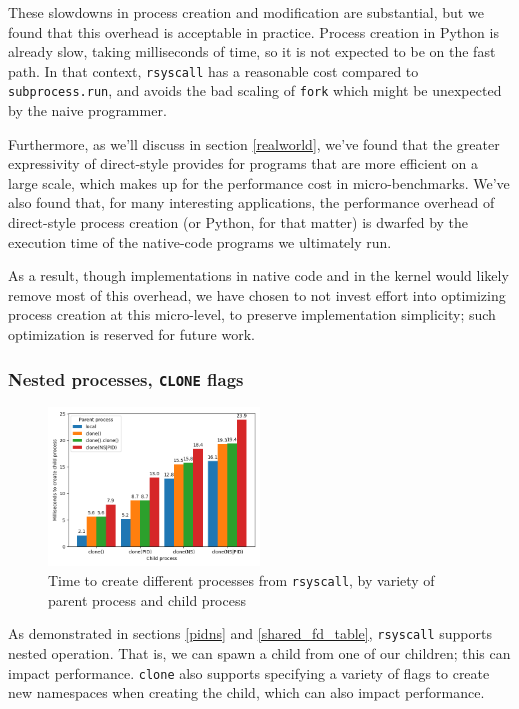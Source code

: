 \documentclass[letterpaper,twocolumn,10pt]{article}
\begin{document}
These slowdowns in process creation and modification are substantial,
but we found that this overhead is acceptable in practice.
Process creation in Python is already slow, taking milliseconds of time,
so it is not expected to be on the fast path.
In that context, \texttt{rsyscall} has a reasonable cost compared to \texttt{subprocess.run},
and avoids the bad scaling of \texttt{fork} which might be unexpected by the naive programmer.

Furthermore, as we'll discuss in section \ref{realworld},
we've found that the greater expressivity of direct-style
provides for programs that are more efficient on a large scale,
which makes up for the performance cost in micro-benchmarks.
We've also found that, for many interesting applications,
the performance overhead of direct-style process creation (or Python, for that matter)
is dwarfed by the execution time of the native-code programs we ultimately run.

As a result, though implementations in native code and in the kernel would likely remove most of this overhead,
we have chosen to not invest effort into optimizing process creation at this micro-level,
to preserve implementation simplicity;
such optimization is reserved for future work.
\subsubsection{Nested processes, \texttt{CLONE} flags}\label{clone_bench}
\begin{figure}
\centering
 \includegraphics[width=0.5\textwidth]{clone_bench}
 \caption{Time to create different processes from \texttt{rsyscall}, by variety of parent process and child process}
 \label{fig:clone_bench}
\end{figure}
As demonstrated in sections \ref{pidns} and \ref{shared_fd_table},
\texttt{rsyscall} supports nested operation.
That is, we can spawn a child from one of our children;
this can impact performance.
\texttt{clone} also supports specifying a variety of flags to create new namespaces when creating the child,
which can also impact performance.
\end{document}
